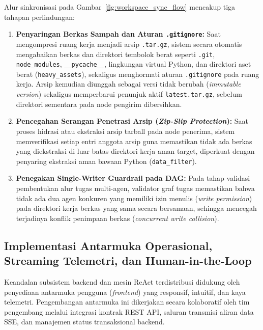Alur sinkronisasi pada Gambar~\ref{fig:workspace_sync_flow} mencakup tiga tahapan perlindungan:
\begin{enumerate}[label=\arabic*.]
  \item \textbf{Penyaringan Berkas Sampah dan Aturan \texttt{.gitignore}:} Saat mengompresi ruang kerja menjadi arsip \texttt{.tar.gz}, sistem secara otomatis mengabaikan berkas dan direktori tembolok berat seperti \texttt{.git}, \texttt{node\_modules}, \texttt{\_\_pycache\_\_}, lingkungan virtual Python, dan direktori aset berat (\texttt{heavy\_assets}), sekaligus menghormati aturan \texttt{.gitignore} pada ruang kerja. Arsip kemudian diunggah sebagai versi tidak berubah (\textit{immutable version}) sekaligus memperbarui penunjuk aktif \texttt{latest.tar.gz}, sebelum direktori sementara pada node pengirim dibersihkan.
  \item \textbf{Pencegahan Serangan Penetrasi Arsip (\textit{Zip-Slip Protection}):} Saat proses hidrasi atau ekstraksi arsip tarball pada node penerima, sistem memverifikasi setiap entri anggota arsip guna memastikan tidak ada berkas yang diekstraksi di luar batas direktori kerja aman target, diperkuat dengan penyaring ekstraksi aman bawaan Python (\texttt{data\_filter}).
  \item \textbf{Penegakan Single-Writer Guardrail pada DAG:} Pada tahap validasi pembentukan alur tugas multi-agen, validator graf tugas memastikan bahwa tidak ada dua agen konkuren yang memiliki izin menulis (\textit{write permission}) pada direktori kerja berkas yang sama secara bersamaan, sehingga mencegah terjadinya konflik penimpaan berkas (\textit{concurrent write collision}).
\end{enumerate}

\subsection{Implementasi Antarmuka Operasional, Streaming Telemetri, dan Human-in-the-Loop}

Keandalan subsistem backend dan mesin ReAct terdistribusi didukung oleh penyediaan antarmuka pengguna (\textit{frontend}) yang responsif, intuitif, dan kaya telemetri. Pengembangan antarmuka ini dikerjakan secara kolaboratif oleh tim pengembang melalui integrasi kontrak REST API, saluran transmisi aliran data SSE, dan manajemen status transaksional backend.

